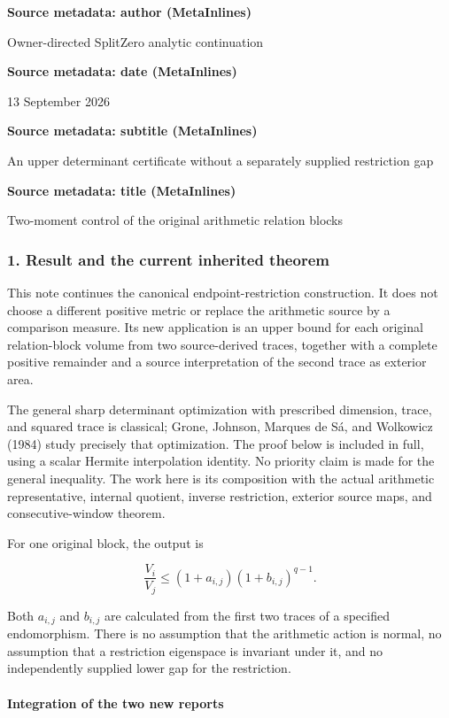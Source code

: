 \textbf{Source metadata: author (MetaInlines)}

Owner-directed SplitZero analytic continuation

\textbf{Source metadata: date (MetaInlines)}

13 September 2026

\textbf{Source metadata: subtitle (MetaInlines)}

An upper determinant certificate without a separately supplied restriction gap

\textbf{Source metadata: title (MetaInlines)}

Two-moment control of the original arithmetic relation blocks

\subsubsection{1. Result and the current inherited theorem}\label{endpoint-relation_moment_original--result-and-the-current-inherited-theorem}

This note continues the canonical endpoint-restriction construction. It does not choose a different positive metric or replace the arithmetic source by a comparison measure. Its new application is an upper bound for each original relation-block volume from two source-derived traces, together with a complete positive remainder and a source interpretation of the second trace as exterior area.

The general sharp determinant optimization with prescribed dimension, trace, and squared trace is classical; Grone, Johnson, Marques de Sá, and Wolkowicz (1984) study precisely that optimization. The proof below is included in full, using a scalar Hermite interpolation identity. No priority claim is made for the general inequality. The work here is its composition with the actual arithmetic representative, internal quotient, inverse restriction, exterior source maps, and consecutive-window theorem.

For one original block, the output is

\[
 \boxed{\frac{V_i}{V_j}\le(1+a_{i,j})(1+b_{i,j})^{q-1}.}                 \tag{1}
\]

Both \(a_{i,j}\) and \(b_{i,j}\) are calculated from the first two traces of a specified endomorphism. There is no assumption that the arithmetic action is normal, no assumption that a restriction eigenspace is invariant under it, and no independently supplied lower gap for the restriction.

\paragraph{Integration of the two new reports}\label{endpoint-relation_moment_original--integration-of-the-two-new-reports}

